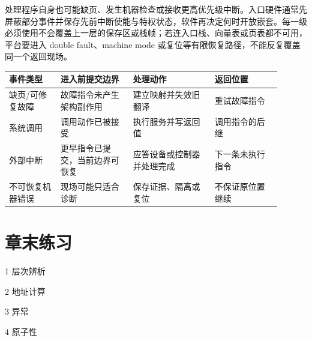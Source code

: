 
处理程序自身也可能缺页、发生机器检查或接收更高优先级中断。入口硬件通常先屏蔽部分事件并保存先前中断使能与特权状态，软件再决定何时开放嵌套。每一级必须使用不会覆盖上一层的保存区或栈帧；若连入口栈、向量表或页表都不可用，平台要进入 double fault、machine mode 或复位等有限恢复路径，不能反复覆盖同一个返回现场。

\begin{longtable}{L{0.17\linewidth}L{0.24\linewidth}L{0.27\linewidth}L{0.22\linewidth}}
\toprule
事件类型 & 进入前提交边界 & 处理动作 & 返回位置 \\
\midrule
缺页/可修复故障 & 故障指令未产生架构副作用 & 建立映射并失效旧翻译 & 重试故障指令 \\\tablerowrule
系统调用 & 调用动作已被接受 & 执行服务并写返回值 & 调用指令的后继 \\\tablerowrule
外部中断 & 更早指令已提交，当前边界可恢复 & 应答设备或控制器并处理完成 & 下一条未执行指令 \\\tablerowrule
不可恢复机器错误 & 现场可能只适合诊断 & 保存证据、隔离或复位 & 不保证原位置继续 \\
\bottomrule
\end{longtable}

\section*{章末练习}

\begin{chapterexercise}{1}
层次辨析
\end{chapterexercise}

\begin{chapterexercise}{2}
地址计算
\end{chapterexercise}

\begin{chapterexercise}{3}
异常
\end{chapterexercise}

\begin{chapterexercise}{4}
原子性
\end{chapterexercise}

